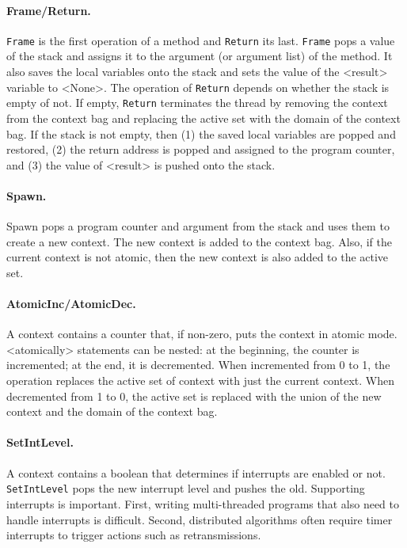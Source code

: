 \documentclass[twocolumn]{article}
\begin{document}
\paragraph{Frame/Return.}  \texttt{Frame} is the first operation of
a method and \texttt{Return} its last.  \texttt{Frame} pops a value of
the stack and assigns it to the argument (or argument list) of the
method.  It also saves the local variables onto the stack and sets the
value of the <{result}> variable to <{None}>.  The operation of
\texttt{Return} depends on whether the stack is empty of not.  If empty,
\texttt{Return} terminates the thread by removing the context from the
context bag and replacing the active set with the domain of the context bag.
If the stack is not empty, then (1) the saved local variables are popped
and restored, (2) the return address is popped and assigned to the
program counter, and (3) the value of <{result}> is pushed onto the
stack.

\paragraph{Spawn.}  Spawn pops a program counter and argument from the
stack and uses them to create a new context.  The new context is added
to the context bag.  Also, if the current context is not atomic, then
the new context is also added to the active set.

\paragraph{AtomicInc/AtomicDec.}  A context contains a counter that,
if non-zero, puts the context in atomic mode.
<{atomically}> statements can be nested: at the beginning, the
counter is incremented; at the end, it is decremented.
When incremented from 0 to 1, the operation replaces the active
set of context with just the current context.  When decremented
from 1 to 0, the active set is replaced with the union of the
new context and the domain of the context bag.

\paragraph{SetIntLevel.}  A context contains a boolean that determines
if interrupts are enabled or not.  \texttt{SetIntLevel} pops the
new interrupt level and pushes the old.  Supporting interrupts is
important.  First, writing multi-threaded programs that also need
to handle interrupts is difficult.  Second, distributed algorithms
often require timer interrupts to trigger actions such as retransmissions.
\end{document}
